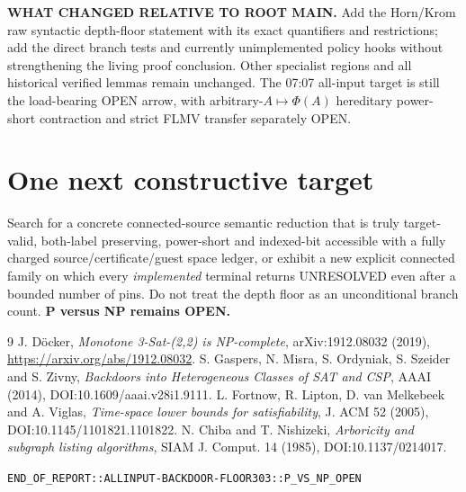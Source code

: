 \documentclass[11pt]{article}
\begin{document}
\noindent\textbf{WHAT CHANGED RELATIVE TO ROOT MAIN.} Add the Horn/Krom raw syntactic depth-floor statement with its exact quantifiers and restrictions; add the direct branch tests and currently unimplemented policy hooks without strengthening the living proof conclusion. Other specialist regions and all historical verified lemmas remain unchanged. The 07:07 all-input target is still the load-bearing OPEN arrow, with arbitrary-$A\mapsto\Phi(A)$ hereditary power-short contraction and strict FLMV transfer separately OPEN.

\section{One next constructive target}
Search for a concrete connected-source semantic reduction that is truly target-valid, both-label preserving, power-short and indexed-bit accessible with a fully charged source/certificate/guest space ledger, or exhibit a new explicit connected family on which every \emph{implemented} terminal returns UNRESOLVED even after a bounded number of pins. Do not treat the depth floor as an unconditional branch count. \textbf{P versus NP remains OPEN.}

\begin{thebibliography}{9}
 J. D\"ocker, \emph{Monotone 3-Sat-(2,2) is NP-complete}, arXiv:1912.08032 (2019), \url{https://arxiv.org/abs/1912.08032}.
 S. Gaspers, N. Misra, S. Ordyniak, S. Szeider and S. Zivny, \emph{Backdoors into Heterogeneous Classes of SAT and CSP}, AAAI (2014), DOI:10.1609/aaai.v28i1.9111.
 L. Fortnow, R. Lipton, D. van Melkebeek and A. Viglas, \emph{Time-space lower bounds for satisfiability}, J. ACM 52 (2005), DOI:10.1145/1101821.1101822.
 N. Chiba and T. Nishizeki, \emph{Arboricity and subgraph listing algorithms}, SIAM J. Comput. 14 (1985), DOI:10.1137/0214017.
\end{thebibliography}
\vspace{1em}\noindent\texttt{END\_OF\_REPORT::ALLINPUT-BACKDOOR-FLOOR303::P\_VS\_NP\_OPEN}
\end{document}
